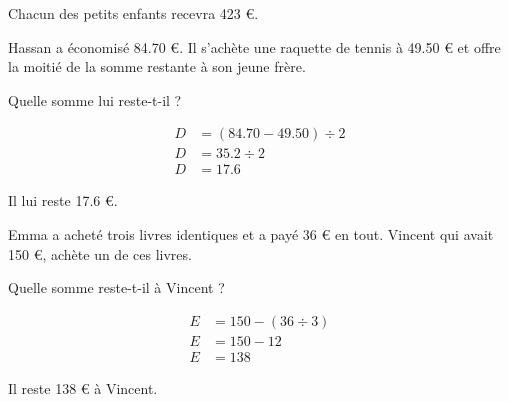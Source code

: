 \begin{questions}
\begin{solution}
		Chacun des petits enfants recevra 423 €.
	\end{solution}
	
	
	\question Hassan a économisé \num{84.70} €. Il s'achète une raquette de tennis à \num{49.50} € et offre la moitié de la somme restante à son jeune frère. 
	
	Quelle somme lui reste-t-il ?
	
	\begin{solution}
		\begin{align*}
			D &= (\num{84.70} - \num{49.50}) \div 2 \\
			D &= \num{35.2} \div 2 \\
			D &= \num{17.6} 
		\end{align*}
		
		Il lui reste \num{17.6} €.
	\end{solution}
	
	\question Emma a acheté trois livres identiques et a payé 36 € en tout. Vincent qui avait 150 €, achète un de ces livres. 
	
	Quelle somme reste-t-il à Vincent ?
	
	\begin{solution}
		\begin{align*}
			E &= 150 - (36 \div 3) \\
			E &= 150 - 12 \\
			E &= 138
		\end{align*}
		
		
		Il reste 138 € à Vincent.
		
	\end{solution}
	
\end{questions}